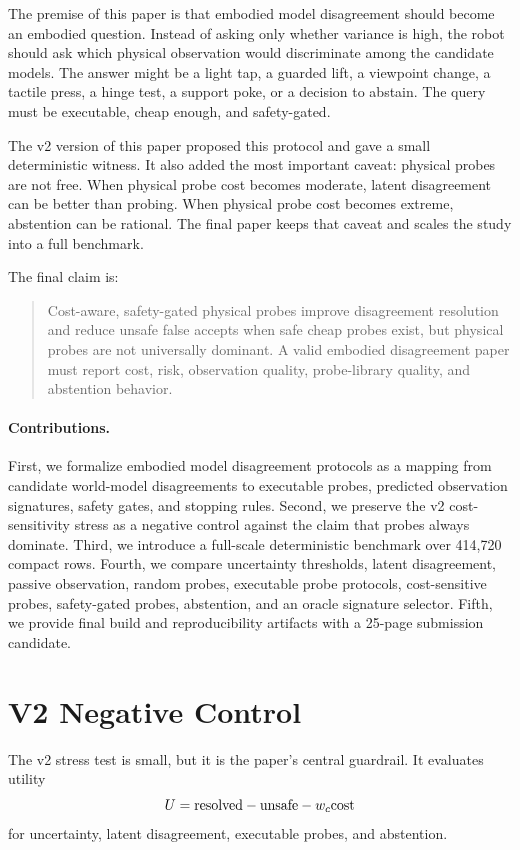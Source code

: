 \documentclass{article}
\begin{document}
The premise of this paper is that embodied model disagreement should become an embodied question. Instead of asking only whether variance is high, the robot should ask which physical observation would discriminate among the candidate models. The answer might be a light tap, a guarded lift, a viewpoint change, a tactile press, a hinge test, a support poke, or a decision to abstain. The query must be executable, cheap enough, and safety-gated.

The v2 version of this paper proposed this protocol and gave a small deterministic witness. It also added the most important caveat: physical probes are not free. When physical probe cost becomes moderate, latent disagreement can be better than probing. When physical probe cost becomes extreme, abstention can be rational. The final paper keeps that caveat and scales the study into a full benchmark.

The final claim is:
\begin{quote}
Cost-aware, safety-gated physical probes improve disagreement resolution and reduce unsafe false accepts when safe cheap probes exist, but physical probes are not universally dominant. A valid embodied disagreement paper must report cost, risk, observation quality, probe-library quality, and abstention behavior.
\end{quote}

\paragraph{Contributions.}
First, we formalize embodied model disagreement protocols as a mapping from candidate world-model disagreements to executable probes, predicted observation signatures, safety gates, and stopping rules. Second, we preserve the v2 cost-sensitivity stress as a negative control against the claim that probes always dominate. Third, we introduce a full-scale deterministic benchmark over 414,720 compact rows. Fourth, we compare uncertainty thresholds, latent disagreement, passive observation, random probes, executable probe protocols, cost-sensitive probes, safety-gated probes, abstention, and an oracle signature selector. Fifth, we provide final build and reproducibility artifacts with a 25-page submission candidate.

\section{V2 Negative Control}

The v2 stress test is small, but it is the paper's central guardrail. It evaluates utility
\[
U = {\rm resolved} - {\rm unsafe} - w_c {\rm cost}
\]
for uncertainty, latent disagreement, executable probes, and abstention.
\end{document}
